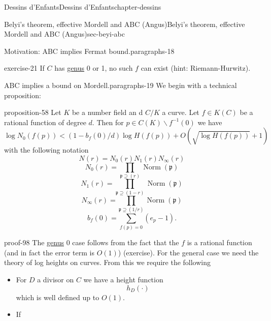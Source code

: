 \documentclass[oneside,10pt,]{book}
\numberwithin{equation}{section}
\newcommand{\ideal}[1]{\mathfrak{#1}}
\newcommand{\inv}{^{-1}}
\DeclareMathOperator{\norm}{Norm}
\newcommand{\lt}{<}
\begin{document}
\begin{chapterptx}{Dessins d'Enfants}{}{Dessins d'Enfants}{}{}{chapter-dessins}
\begin{sectionptx}{Belyi's theorem, effective Mordell and ABC (Angus)}{}{Belyi's theorem, effective Mordell and ABC (Angus)}{}{}{sec-beyi-abc}
\begin{paragraphs}{Motivation: ABC implies Fermat bound.}{paragraphs-18}
\begin{inlineexercise}{}{exercise-21}
\hypertarget{p-685}{}%
If \(C\)  has \hyperref[def-class-set]{genus} 0 or 1, no such \(f\) can exist (hint: Riemann-Hurwitz).%
\end{inlineexercise}
\end{paragraphs}%
\begin{paragraphs}{ABC implies a bound on Mordell.}{paragraphs-19}%
\hypertarget{p-686}{}%
We begin with a technical proposition:%
\begin{proposition}{}{}{proposition-58}%
\hypertarget{p-687}{}%
Let \(K\) be a number field an d \(C/K\) a  curve. Let \(f \in K(C)\) be a rational function of degree \(d\). Then for \(p \in C(K) \smallsetminus f\inv(0)\) we have%
\begin{equation*}
\log N_0(f(p)) \lt (1- b_f(0)/d) \log H(f(p)) + O(\sqrt{\log H(f(p))} + 1)
\end{equation*}
with the following notation%
\begin{equation*}
N(r)  =N_0(r) N_1(r) N_\infty(r)
\end{equation*}
%
\begin{equation*}
N_0(r) = \prod_{\ideal p \supseteq (r)} \norm(\ideal p)
\end{equation*}
%
\begin{equation*}
N_1(r) = \prod_{\ideal p \supseteq (1-r)} \norm(\ideal p)
\end{equation*}
%
\begin{equation*}
N_\infty(r) = \prod_{\ideal p \supseteq (1/r)} \norm(\ideal p)
\end{equation*}
%
\begin{equation*}
b_f(0) = \sum_{f(p) = 0} (e_p - 1)\text{.}
\end{equation*}
%
\end{proposition}
\begin{proofptx}{}{proof-98}
\hypertarget{p-688}{}%
The \hyperref[def-class-set]{genus} 0 case follows from the fact that the \(f\) is a rational function (and in fact the error term is \(O(1)\)) (exercise). For the general case we need the theory of log heights on curves. From this we require the following\leavevmode%
\begin{itemize}[label=\textbullet]
\item{}For \(D\) a divisor on \(C\) we have  a height function%
\begin{equation*}
h_D(\cdot)
\end{equation*}
which is well defined up to  \(O(1)\).%
\item{}If%
\begin{equation*}

\end{equation*}
\end{itemize}
\end{proofptx}
\end{paragraphs}
\end{sectionptx}
\end{chapterptx}
\end{document}
